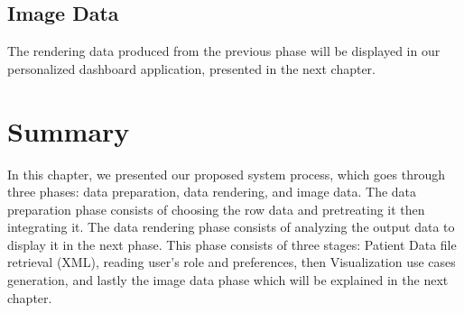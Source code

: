 \subsection{Image Data}
The rendering data produced from the previous phase will be displayed in our personalized dashboard application, presented in the next chapter.

\section{Summary}
In this chapter, we presented our proposed system process, which goes through three phases: data preparation, data rendering, and image data. The data preparation phase consists of choosing the row data and pretreating it then integrating it. The data rendering phase consists of analyzing the output data to display it in the next phase. This phase consists of three stages:  Patient Data file retrieval (XML), reading user’s role and preferences, then Visualization use cases generation, and lastly the image data phase which will be explained in the next chapter. 
